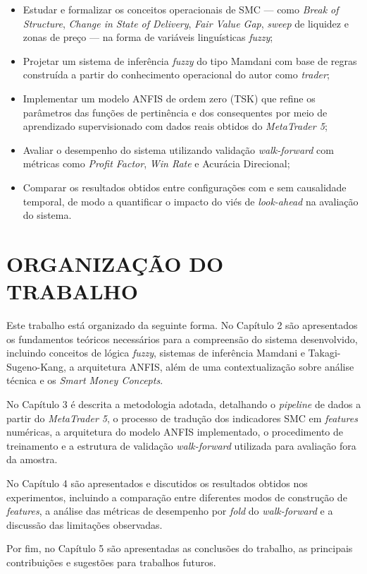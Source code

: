 \begin{itemize}
    \item Estudar e formalizar os conceitos operacionais de SMC --- como \textit{Break of Structure}, \textit{Change in State of Delivery}, \textit{Fair Value Gap}, \textit{sweep} de liquidez e zonas de preço --- na forma de variáveis linguísticas \textit{fuzzy};
    \item Projetar um sistema de inferência \textit{fuzzy} do tipo Mamdani com base de regras construída a partir do conhecimento operacional do autor como \textit{trader};
    \item Implementar um modelo ANFIS de ordem zero (TSK) que refine os parâmetros das funções de pertinência e dos consequentes por meio de aprendizado supervisionado com dados reais obtidos do \textit{MetaTrader 5};
    \item Avaliar o desempenho do sistema utilizando validação \textit{walk-forward} com métricas como \textit{Profit Factor}, \textit{Win Rate} e Acurácia Direcional;
    \item Comparar os resultados obtidos entre configurações com e sem causalidade temporal, de modo a quantificar o impacto do viés de \textit{look-ahead} na avaliação do sistema.
\end{itemize}


\section{\uppercase{Organização do Trabalho}}

Este trabalho está organizado da seguinte forma. No Capítulo 2 são apresentados os fundamentos teóricos necessários para a compreensão do sistema desenvolvido, incluindo conceitos de lógica \textit{fuzzy}, sistemas de inferência Mamdani e Takagi-Sugeno-Kang, a arquitetura ANFIS, além de uma contextualização sobre análise técnica e os \textit{Smart Money Concepts}.

No Capítulo 3 é descrita a metodologia adotada, detalhando o \textit{pipeline} de dados a partir do \textit{MetaTrader 5}, o processo de tradução dos indicadores SMC em \textit{features} numéricas, a arquitetura do modelo ANFIS implementado, o procedimento de treinamento e a estrutura de validação \textit{walk-forward} utilizada para avaliação fora da amostra.

No Capítulo 4 são apresentados e discutidos os resultados obtidos nos experimentos, incluindo a comparação entre diferentes modos de construção de \textit{features}, a análise das métricas de desempenho por \textit{fold} do \textit{walk-forward} e a discussão das limitações observadas.

Por fim, no Capítulo 5 são apresentadas as conclusões do trabalho, as principais contribuições e sugestões para trabalhos futuros.
